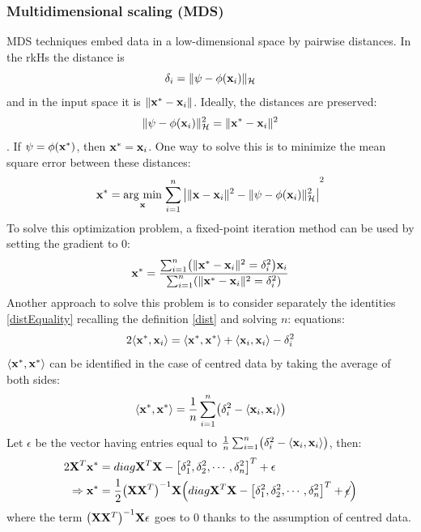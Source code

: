 \subsubsection{Multidimensional scaling (MDS)}
MDS techniques embed data in a low-dimensional space by pairwise distances. In the rkHs the distance is 
\begin{equation}
\label{dist}
\delta_i = \|\psi- \phi(\x_i)\|_\CMcal{H}
\end{equation}
 and in the input space it is $\|\mathbf{x}^* - \mathbf{x}_i\|$. Ideally, the distances are preserved: 
 \begin{equation}
 \label{distEquality}
 \|\psi- \phi(\x_i)\|_\CMcal{H}^2 = \|\x^* - \x_i\|^2
 \end{equation}.
If $\psi = \phi(\mathbf{x}^*)$, then $\mathbf{x}^* = \mathbf{x}_i$. One way to solve this is to minimize the mean square error between these distances:
\begin{equation}
\x^* = \argmin{\x}{\sum_{i=1}^n \left| \|\x-\x_i\|^2 - \|\psi-\phi(\x_i) \|_\CMcal{H}^2 \right|}^2
\end{equation}
To solve this optimization problem, a fixed-point iteration method can be used by setting the gradient to $0$:
\begin{equation}
\x^* = \frac{\sum_{i=1}^n \br{\|\x^* - \x_i\|^2 = \delta_i^2}\x_i}{\sum_{i=1}^n \br{\|\x^* - \x_i\|^2 = \delta_i^2}}
\end{equation}
Another approach to solve this problem is to consider separately the identities \autoref{distEquality} recalling the definition \autoref{dist} and solving $n$:
 equations:
\begin{equation}
2\langle \mathbf{x}^*, \mathbf{x}_i\rangle=\langle \mathbf{x}^*, \mathbf{x}^*\rangle +\langle \mathbf{x}_i,  \mathbf{x}_i\rangle-\delta_i^2
\end{equation}
$\langle \mathbf{x}^*, \mathbf{x}^*\rangle $ can be identified in the case of centred data by taking the average of both sides:
\begin{equation}
\langle \x^*, \x^*\rangle  = \frac{1}{n}  \sum_{i=1}^n\br{\delta_i^2- \langle \x_i, \x_i\rangle }
\end{equation}
Let $\epsilon$ be the vector having entries equal to $\frac{1}{n}\sum_{i=1}^n\br{\delta_i^2-\langle \x_i, \x_i\rangle }$, then:
\begin{equation}
\begin{aligned}
2\X^T\x^* &= diag{\X^T \X} - \left[\delta_1^2, \delta_2^2, \cdots, \delta_n^2\right]^T+\epsilon\\
\Rightarrow \x^* &= \frac{1}{2}\br{\X\X^T}^{-1}\X\br{diag{\X^T \X} - \left[\delta_1^2, \delta_2^2, \cdots, \delta_n^2\right]^T+\cancel{\epsilon}}
\end{aligned}
\end{equation}
where the term $\br{\X\X^T}^{-1}\X\epsilon$ goes to $0$ thanks to the assumption of centred data.

